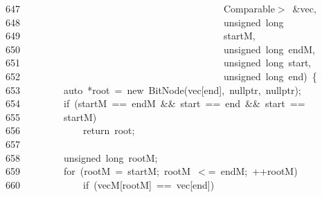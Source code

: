 \documentclass[11pt,a4paper]{ctexart}
\newcommand{\hlstd}[1]{\textcolor[rgb]{0.2,0.2,0.2}{#1}}
\newcommand{\hlopt}[1]{\textcolor[rgb]{0.2,0.2,0.2}{#1}}
\newcommand{\hllin}[1]{\textcolor[rgb]{0.59,0.59,0.59}{#1}}
\newcommand{\hlkwa}[1]{\textcolor[rgb]{0.23,0.42,0.78}{#1}}
\newcommand{\hlkwb}[1]{\textcolor[rgb]{0.63,0,0.31}{#1}}
\newcommand{\hlkwc}[1]{\textcolor[rgb]{0,0.63,0.31}{#1}}
\newcommand{\hlkwd}[1]{\textcolor[rgb]{0.78,0.23,0.41}{#1}}
\begin{document}
\hllin{647\ }\hlstd{}\hlstd{\ \ \ \ \ \ \ \ \ \ \ \ \ \ \ \ \ \ \ \ \ \ \ \ \ \ \ \ \ \ \ \ \ \ \ \ \ \ \ \ \ }\hlstd{Comparable}\hlopt{$>$\ \&}\hlstd{vec}\hlopt{,}\\
\hllin{648\ }\hlstd{}\hlstd{\ \ \ \ \ \ \ \ \ \ \ \ \ \ \ \ \ \ \ \ \ \ \ \ \ \ \ \ \ \ \ \ \ \ \ \ \ \ \ \ \ }\hlstd{}\hlkwb{unsigned\ long\ }\Righttorque\\
\hllin{649\ }\hlstd{}\hlstd{\ \ \ \ \ \ \ \ \ \ \ \ \ \ \ \ \ \ \ \ \ \ \ \ \ \ \ \ \ \ \ \ \ \ \ \ \ \ \ \ \ }\hlstd{startM}\hlopt{,}\\
\hllin{650\ }\hlstd{}\hlstd{\ \ \ \ \ \ \ \ \ \ \ \ \ \ \ \ \ \ \ \ \ \ \ \ \ \ \ \ \ \ \ \ \ \ \ \ \ \ \ \ \ }\hlstd{}\hlkwb{unsigned\ long\ }\hlstd{endM}\hlopt{,}\\
\hllin{651\ }\hlstd{}\hlstd{\ \ \ \ \ \ \ \ \ \ \ \ \ \ \ \ \ \ \ \ \ \ \ \ \ \ \ \ \ \ \ \ \ \ \ \ \ \ \ \ \ }\hlstd{}\hlkwb{unsigned\ long\ }\hlstd{start}\hlopt{,}\\
\hllin{652\ }\hlstd{}\hlstd{\ \ \ \ \ \ \ \ \ \ \ \ \ \ \ \ \ \ \ \ \ \ \ \ \ \ \ \ \ \ \ \ \ \ \ \ \ \ \ \ \ }\hlstd{}\hlkwb{unsigned\ long\ }\hlstd{end}\hlopt{)\ \{}\\
\hllin{653\ }\hlstd{}\hlstd{\ \ \ \ \ \ \ \ }\hlstd{}\hlkwc{auto\ }\hlstd{}\hlopt{{*}}\hlstd{root\ }\hlopt{=\ }\hlstd{}\hlkwa{new\ }\hlstd{}\hlkwd{BitNode}\hlstd{}\hlopt{(}\hlstd{vec}\hlopt{{[}}\hlstd{end}\hlopt{{]},\ }\hlstd{}\hlkwc{nullptr}\hlstd{}\hlopt{,\ }\hlstd{}\hlkwc{nullptr}\hlstd{}\hlopt{);}\\
\hllin{654\ }\hlstd{}\hlstd{\ \ \ \ \ \ \ \ }\hlstd{}\hlkwa{if\ }\hlstd{}\hlopt{(}\hlstd{startM\ }\hlopt{==\ }\hlstd{endM\ }\hlopt{\&\&\ }\hlstd{start\ }\hlopt{==\ }\hlstd{end\ }\hlopt{\&\&\ }\hlstd{start\ }\hlopt{==\ }\Righttorque\\
\hllin{655\ }\hlstd{}\hlstd{\ \ \ \ \ \ \ \ }\hlstd{startM}\hlopt{)}\\
\hllin{656\ }\hlstd{}\hlstd{\ \ \ \ \ \ \ \ \ \ \ \ }\hlstd{}\hlkwa{return\ }\hlstd{root}\hlopt{;}\\
\hllin{657\ }\hlstd{}\\
\hllin{658\ }\hlstd{}\hlstd{\ \ \ \ \ \ \ \ }\hlstd{}\hlkwb{unsigned\ long\ }\hlstd{rootM}\hlopt{;}\\
\hllin{659\ }\hlstd{}\hlstd{\ \ \ \ \ \ \ \ }\hlstd{}\hlkwa{for\ }\hlstd{}\hlopt{(}\hlstd{rootM\ }\hlopt{=\ }\hlstd{startM}\hlopt{;\ }\hlstd{rootM\ }\hlopt{$<$=\ }\hlstd{endM}\hlopt{;\ ++}\hlstd{rootM}\hlopt{)}\\
\hllin{660\ }\hlstd{}\hlstd{\ \ \ \ \ \ \ \ \ \ \ \ }\hlstd{}\hlkwa{if\ }\hlstd{}\hlopt{(}\hlstd{vecM}\hlopt{{[}}\hlstd{rootM}\hlopt{{]}\ ==\ }\hlstd{vec}\hlopt{{[}}\hlstd{end}\hlopt{{]})}\\
\end{document}
